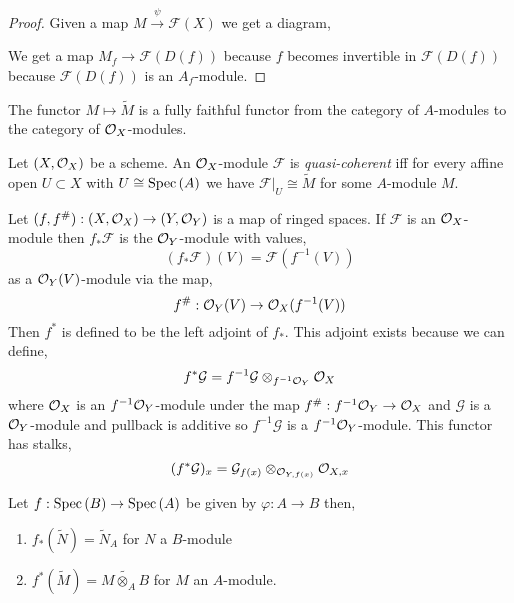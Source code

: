 \documentclass[12pt]{article}
\begin{document}
\begin{proof}
Given a map $M \xrightarrow{\psi} \mathcal{F}(X)$ we get a diagram,
\begin{center}
\end{center}
We get a map $M_f \to \mathcal{F}(D(f))$ because $f$ becomes invertible in $\mathcal{F}(D(f))$ because $\mathcal{F}(D(f))$  is an $A_f$-module. 
\end{proof}

\begin{corollary}
The functor $M \mapsto \widetilde{M}$ is a fully faithful functor from the category of $A$-modules to the category of $\mathcal{O}_{X}$-modules.  
\end{corollary}

\begin{definition}
Let $(X, \mathcal{O}_{X})$ be a scheme. An $\mathcal{O}_{X}$-module $\mathcal{F}$ is \textit{quasi-coherent} iff for every affine open $U \subset X$ with $U \cong \mathrm{Spec}\left( A \right)$ we have $\mathcal{F}|_U \cong \widetilde{M}$ for some $A$-module $M$. 
\end{definition}

\begin{definition}
Let $(f, f^\#) : (X, \mathcal{O}_{X}) \to (Y, \mathcal{O}_{Y})$ is a map of ringed spaces. If $\mathcal{F}$ is an $\mathcal{O}_{X}$-module then $f_* \mathcal{F}$ is the $\mathcal{O}_{Y}$-module with values,
\[ (f_* \mathcal{F})(V) = \mathcal{F}(f^{-1}(V)) \]
as a $\mathcal{O}_{Y}(V)$-module via the map,
\[ f^\# : \mathcal{O}_{Y}(V) \to \mathcal{O}_{X}(f^{-1}(V)) \]
Then $f^*$ is defined to be the left adjoint of $f_*$. This adjoint exists because we can define,
\[ f^* \mathcal{G} = f^{-1} \mathcal{G} \otimes_{f^{-1} \mathcal{O}_{Y}} \mathcal{O}_{X} \]
where $\mathcal{O}_{X}$ is an $f^{-1} \mathcal{O}_{Y}$-module under the map $f^\# : f^{-1} \mathcal{O}_{Y} \to \mathcal{O}_{X}$ and $\mathcal{G}$ is a $\mathcal{O}_{Y}$-module and pullback is additive so $f^{-1} \mathcal{G}$ is a $f^{-1} \mathcal{O}_{Y}$-module. 
This functor has stalks,
\[ (f^* \mathcal{G})_x = \mathcal{G}_{f(x)} \otimes_{\mathcal{O}_{Y, f(x)}} \mathcal{O}_{X, x} \]
\end{definition}

\begin{lemma}
Let $f : \mathrm{Spec}\left( B \right) \to \mathrm{Spec}\left( A \right)$ be given by $\varphi : A \to B$ then,
\begin{enumerate}
\item $f_*(\widetilde{N}) = \widetilde{N}_A$ for $N$ a $B$-module
\item $f^*(\widetilde{M}) = \widetilde{M \otimes_A B}$ for $M$ an $A$-module.
\end{enumerate}
\end{lemma}
\end{document}
